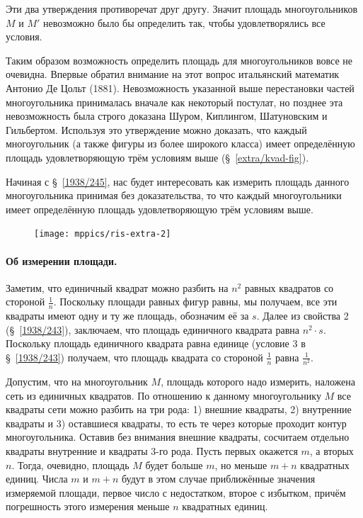 \documentclass[twoside]{book}
\begin{document}
Эти два утверждения противоречат друг другу.
Значит площадь многоугольников $M$ и $M'$ невозможно было бы определить так, чтобы удовлетворялись все условия.

{\sloppy
Таким образом возможность определить площадь для многоугольников вовсе не очевидна.
Впервые обратил внимание на этот вопрос итальянский математик Антонио Де Цольт (1881).
Невозможность указанной выше перестановки частей многоугольника принималась вначале как некоторый постулат, но позднее эта невозможность была строго доказана Шуром, Киплингом, Шатуновским и Гильбертом.
Используя  это утверждение можно доказать, что каждый многоугольник (а также фигуры из более широкого класса) имеет определённую площадь удовлетворяющую трём условиям выше (§~\ref{extra/kvad-fig}).

}


Начиная с §~\ref{1938/245}, нас будет интересовать как измерить площадь данного многоугольника принимая без доказательства, то что каждый многоугольники имеет определённую площадь удовлетворяющую трём условиям выше.

\begin{figure}
\centering
\texttt{[image: mppics/ris-extra-2]}
\caption{}\label{extra/ris-2}
\end{figure}

\paragraph{Об измерении площади.}\label{1938/244}
Заметим, что единичный квадрат можно разбить на $n^2$ равных квадратов со стороной $\tfrac1n$. 
Поскольку площади равных фигур равны, мы получаем, все эти квадраты имеют одну и ту же площадь, обозначим её за $s$.
Далее из свойства 2 (§~\ref{1938/243}), заключаем, что площадь единичного квадрата равна $n^2\cdot s$.
Поскольку площадь единичного квадрата равна единице (условие 3 в §~\ref{1938/243}) получаем, что площадь квадрата со стороной $\tfrac1n$ равна $\tfrac1{n^2}$.

Допустим, что на многоугольник $M$, площадь которого надо измерить, наложена сеть из единичных квадратов.
По отношению к данному многоугольнику $M$ все квадраты сети можно разбить на
три рода: 
1) внешние квадраты, 
2) внутренние квадраты и 
3) оставшиеся квадраты, то есть те через которые проходит контур многоугольника.
Оставив без внимания внешние квадраты, сосчитаем отдельно квадраты внутренние и квадраты 3-го рода.
Пусть первых окажется $m$, а вторых $n$.
Тогда, очевидно, площадь $M$ будет больше $m$, но меньше $m+n$ квадратных единиц.
Числа $m$ и $m+n$ будут в этом случае приближённые значения измеряемой площади, первое число с недостатком, второе с избытком, причём погрешность этого измерения меньше $n$ квадратных единиц.
\end{document}
